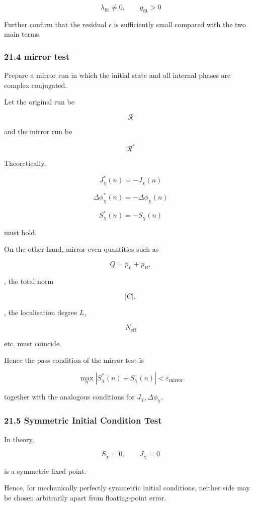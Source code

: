 \documentclass[
  a4paper,
]{article}
\begin{document}
\[
\boxed{
\lambda_{\mathrm{fit}}\neq0,
\qquad
g_{\mathrm{fit}}>0
}
\tag{181}
\]

Further confirm that the residual \(\epsilon\) is sufficiently small
compared with the two main terms.

\subsubsection{21.4 mirror test}\label{mirror-test}

Prepare a mirror run in which the initial state and all internal phases
are complex conjugated.

Let the original run be

\[
\mathcal R
\]

and the mirror run be

\[
\mathcal R^*
\]

Theoretically,

\[
\boxed{
J_\chi^{*}(n)
=
-J_\chi(n)
}
\tag{182}
\]

\[
\boxed{
\Delta\phi_\chi^{*}(n)
=
-\Delta\phi_\chi(n)
}
\tag{183}
\]

\[
\boxed{
S_\chi^{*}(n)
=
-S_\chi(n)
}
\tag{184}
\]

must hold.

On the other hand, mirror-even quantities such as

\[
Q=p_L+p_R,
\]

, the total norm

\[
|C|,
\]

, the localisation degree \(L\),

\[
N_{\mathrm{eff}}
\]

etc. must coincide.

Hence the pass condition of the mirror test is

\[
\boxed{
\max_n
|S_\chi^*(n)+S_\chi(n)|
<
\varepsilon_{\mathrm{mirror}}
}
\tag{185}
\]

together with the analogous conditions for \(J_\chi,\Delta\phi_\chi\).

\subsubsection{21.5 Symmetric Initial Condition
Test}\label{symmetric-initial-condition-test}

In theory,

\[
S_\chi=0,
\qquad
J_\chi=0
\]

is a symmetric fixed point.

Hence, for mechanically perfectly symmetric initial conditions, neither
side may be chosen arbitrarily apart from floating-point error.
\end{document}
